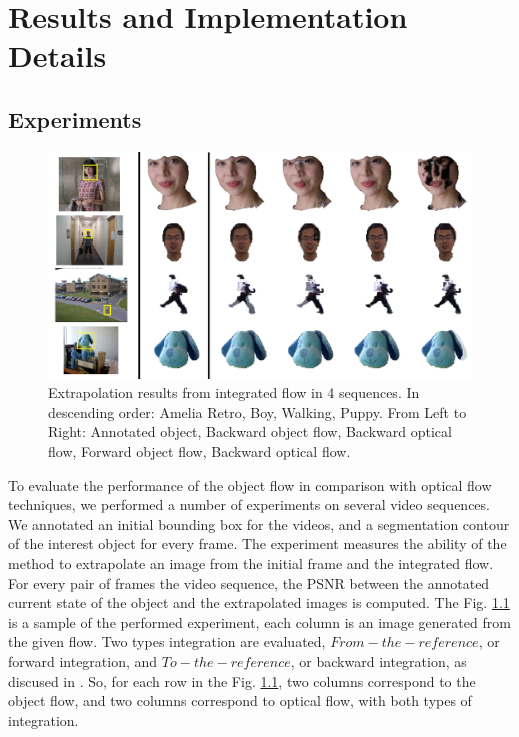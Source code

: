 \chapter{Results and Implementation Details} \label{chap:results}

\section{Experiments}

   \begin{figure}[th]
      \centering
      \includegraphics[width=1.0\textwidth]{../images/extrapolated.png}
      \caption{Extrapolation results from integrated flow in 4 sequences. In descending order: Amelia Retro, Boy, Walking, Puppy. From Left to Right: Annotated object, Backward object flow, Backward optical flow, Forward object flow, Backward optical flow.}
      \label{sample}
   \end{figure}
	\setlength{\belowcaptionskip}{-10pt}

To evaluate the performance of the object flow in comparison with optical flow techniques, we performed 
a number of experiments on several video sequences. We annotated an initial bounding box for the videos, 
and a segmentation contour of the interest object for every frame. The experiment measures the ability of the method to 
extrapolate an image from the initial frame and the integrated flow. For every pair of frames the video sequence, the PSNR between the annotated
current state of the object and the extrapolated images is computed. The Fig. \ref{sample} is a sample of the performed experiment, each column is an image generated from the given flow. 
Two types integration are evaluated, $From-the-reference$, or forward integration, and $To-the-reference$, or backward integration, as discused in \cite{c20}. So, for each row in the Fig. \ref{sample}, two columns correspond to the object flow, and two columns correspond to optical flow, with both types of integration.

